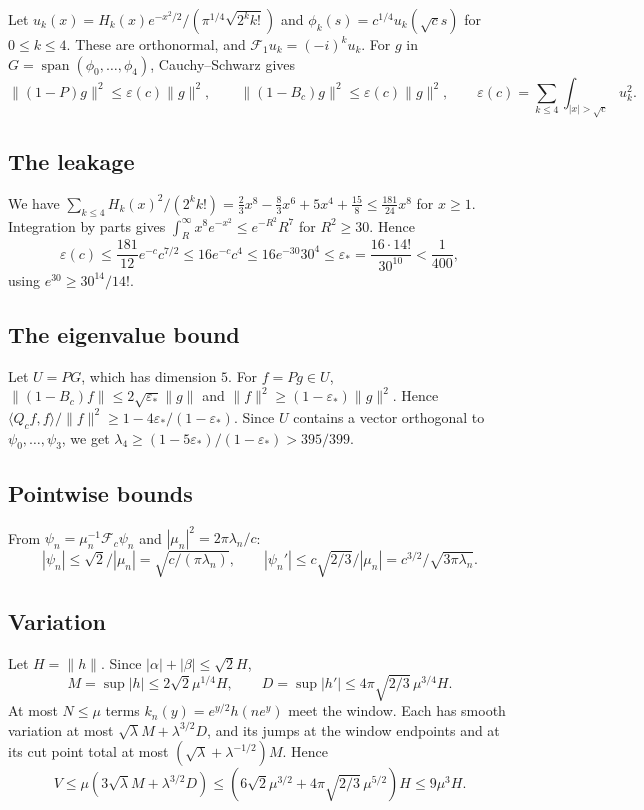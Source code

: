\documentclass[11pt]{amsart}
\theoremstyle{remark}
\numberwithin{equation}{section}
\newcommand{\F}{\mathcal{F}}
\begin{document}
Let $u_k(x)=H_k(x)e^{-x^2/2}/(\pi^{1/4}\sqrt{2^kk!})$ and $\phi_k(s)=c^{1/4}u_k(\sqrt cs)$ for $0\le k\le4$. These are orthonormal, and $\mathcal F_1u_k=(-i)^ku_k$. For $g$ in $G=\operatorname{span}(\phi_0,\dots,\phi_4)$, Cauchy--Schwarz gives
\[
\|(1-P)g\|^2\le\varepsilon(c)\|g\|^2,\qquad\|(1-B_c)g\|^2\le\varepsilon(c)\|g\|^2,\qquad\varepsilon(c)=\sum_{k\le4}\int_{|x|>\sqrt c}u_k^2 .
\]

\subsection*{The leakage}
We have $\sum_{k\le4}H_k(x)^2/(2^kk!)=\frac23x^8-\frac83x^6+5x^4+\frac{15}8\le\frac{181}{24}x^8$ for $x\ge1$. Integration by parts gives $\int_R^\infty x^8e^{-x^2}\le e^{-R^2}R^7$ for $R^2\ge30$. Hence
\[
\varepsilon(c)\le\frac{181}{12}e^{-c}c^{7/2}\le16e^{-c}c^4\le16e^{-30}30^4\le\varepsilon_*=\frac{16\cdot14!}{30^{10}}<\frac1{400},
\]
using $e^{30}\ge30^{14}/14!$.

\subsection*{The eigenvalue bound}
Let $U=PG$, which has dimension $5$. For $f=Pg\in U$, $\|(1-B_c)f\|\le2\sqrt{\varepsilon_*}\|g\|$ and $\|f\|^2\ge(1-\varepsilon_*)\|g\|^2$. Hence $\langle Q_cf,f\rangle/\|f\|^2\ge1-4\varepsilon_*/(1-\varepsilon_*)$. Since $U$ contains a vector orthogonal to $\psi_0,\dots,\psi_3$, we get $\lambda_4\ge(1-5\varepsilon_*)/(1-\varepsilon_*)>395/399$.

\subsection*{Pointwise bounds}
From $\psi_n=\mu_n^{-1}\F_c\psi_n$ and $|\mu_n|^2=2\pi\lambda_n/c$:
\[
|\psi_n|\le\sqrt2/|\mu_n|=\sqrt{c/(\pi\lambda_n)},\qquad|\psi_n'|\le c\sqrt{2/3}/|\mu_n|=c^{3/2}/\sqrt{3\pi\lambda_n}.
\]

\subsection*{Variation}
Let $H=\|h\|$. Since $|\alpha|+|\beta|\le\sqrt2H$,
\[
M=\sup|h|\le2\sqrt2\mu^{1/4}H,\qquad D=\sup|h'|\le4\pi\sqrt{2/3}\,\mu^{3/4}H .
\]
At most $N\le\mu$ terms $k_n(y)=e^{y/2}h(ne^y)$ meet the window. Each has smooth variation at most $\sqrt\lambda M+\lambda^{3/2}D$, and its jumps at the window endpoints and at its cut point total at most $(\sqrt\lambda+\lambda^{-1/2})M$. Hence
\[
V\le\mu(3\sqrt\lambda M+\lambda^{3/2}D)\le(6\sqrt2\mu^{3/2}+4\pi\sqrt{2/3}\,\mu^{5/2})H\le9\mu^3H .
\]
\end{document}
